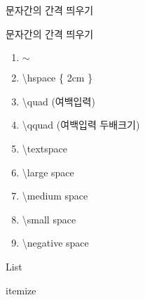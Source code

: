 \documentclass[ aspectratio=149,  10pt,blue,xcolor=pdftex,dvipsnames,table,handout,notes]{beamer}
\begin{document}
		\begin{frame}[t,allowframebreaks]{문자간의 간격 띄우기}

			\begin{block} {문자간의 간격 띄우기}
			\begin{enumerate}

			\item $\sim$\\
			\item \textbackslash hspace \{ 2cm \} \\
			\item \textbackslash quad 	(여백입력)\\
			\item \textbackslash qquad 	(여백입력 두배크기)\\
			\item \textbackslash textspace \\
			\item \textbackslash large space \\
			\item \textbackslash medium space \\
			\item \textbackslash small space \\
			\item \textbackslash negative space \\
			\end{enumerate}

			\end{block}

		\note[item]{}
		\end{frame}






		\begin{frame}[t]{List}

		\note[item]{}
		\end{frame}


		\begin{frame}[t]{itemize}

		\end{frame}
\end{document}

